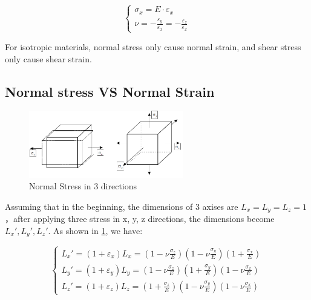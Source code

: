 \documentclass[en,hazy,cyan,8pt,normal]{elegantnote}
\numberwithin{equation}{section}
\begin{document}
    \begin{equation}\label{eq:057}
      \left\{
      \begin{aligned}
        \sigma_x=E\cdot \varepsilon_x\\
        \nu = - \frac{\varepsilon_y}{\varepsilon_x} = - \frac{\varepsilon_z}{\varepsilon_x}
      \end{aligned}
      \right.
    \end{equation}

    For isotropic materials, normal stress only cause normal strain, and shear stress only cause shear strain.

  \subsection{Normal stress VS Normal Strain}\label{subsec:03.03}
    
    \begin{figure}[H]
      \centering
      \includegraphics[width=0.6\textwidth]{image/016.png}
      \caption{Normal Stress in 3 directions}
      \label{fig:016}
    \end{figure}

    Assuming that in the beginning, the dimensions of 3 axises are $L_x=L_y=L_z=1$，after applying three stress in x, y, z directions, the dimensions become $L_x', L_y', L_z'$. As shown in \cref{fig:016}, we have:

    \begin{equation}\label{eq:058}
      \left\{
      \begin{aligned}
        L_x' = (1+\varepsilon_x)L_x = \left(1-\nu\frac{\sigma_z}{E}\right)\left(1-\nu\frac{\sigma_y}{E}\right)\left(1+\frac{\sigma_x}{E}\right) \\
        L_y' = (1+\varepsilon_y)L_y = \left(1-\nu\frac{\sigma_z}{E}\right)\left(1+\frac{\sigma_y}{E}\right)\left(1-\nu\frac{\sigma_x}{E}\right) \\
        L_z' = (1+\varepsilon_z)L_z = \left(1+\frac{\sigma_z}{E}\right)\left(1-\nu\frac{\sigma_y}{E}\right)\left(1-\nu\frac{\sigma_x}{E}\right)
      \end{aligned}
      \right.
    \end{equation}
\end{document}
